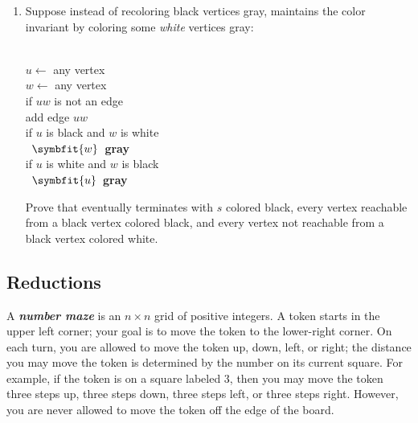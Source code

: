 \begin{exercises}
\begin{enumerate}
\begin{pseudocode}
if $uw$ is not an edge\\
\Indent add edge $uw$\\
\Indent if $u$ is black and $w$ is white\\
\Indent\Indent color $u$ gray\\
\Indent if $u$ is white and $w$ is black\\
\Indent\Indent color $w$ gray
\end{pseudocode}
\noindent Prove that  eventually terminates with every vertex reachable from $s$ colored black and every vertex not reachable from $s$ colored white.
\item {} Suppose instead of recoloring black vertices gray,  maintains the color invariant by coloring some \textit{white} vertices gray:
\begin{pseudocode}
\\
$u \gets$ any vertex\\
$w \gets$ any vertex\\
if $uw$ is not an edge\\
\Indent add edge $uw$\\
\Indent if $u$ is black and $w$ is white\\
\Indent\Indent \mbox{\color{JEred}{\bfseries color} $\symbfit{w}$ {\bfseries gray}}\\
\Indent if $u$ is white and $w$ is black\\
\Indent\Indent \mbox{\color{JEred}{\bfseries color} $\symbfit{u}$ {\bfseries gray}}
\end{pseudocode}
\noindent Prove that  eventually terminates with $s$ colored black, every vertex reachable from a black vertex colored black, and every vertex not reachable from a black vertex colored white.
\end{enumerate}

\subsection*{Reductions}

\item A \textbf{\textit{number maze}} is an $n \times n$ grid of positive integers.
A token starts in the upper left corner; your goal is to move the token to the lower-right corner.
On each turn, you are allowed to move the token up, down, left, or right; the distance you may move the token is determined by the number on its current square.
For example, if the token is on a square labeled $3$, then you may move the token three steps up, three steps down, three steps left, or three steps right.
However, you are never allowed to move the token off the edge of the board.


\end{exercises}
